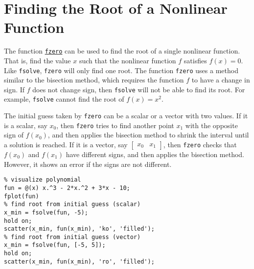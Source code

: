 \documentclass[12pt, a4paper]{article}
\begin{document}
\section{Finding the Root of a Nonlinear Function}
\label{sec:orge0a3896}
The function \href{https://www.mathworks.com/help/matlab/ref/fzero.html?s\_tid=doc\_ta}{\texttt{fzero}} can be used to find the root of a single nonlinear function.
That is, find the value \(x\) such that the nonlinear function \(f\) satisfies \(f(x)=0\).
Like \texttt{fsolve}, \texttt{fzero} will only find one root.
The function \texttt{fzero} uses a method similar to the bisection method, which requires the function \(f\) to have a change in sign.
If \(f\) does not change sign, then \texttt{fsolve} will not be able to find its root.
For example, \texttt{fsolve} cannot find the root of \(f(x)=x^2\).

The initial guess taken by \texttt{fzero} can be a scalar or a vector with two values.
If it is a scalar, say \(x_0\), then \texttt{fzero} tries to find another point \(x_1\) with the opposite sign of \(f(x_0)\), and then applies the bisection method to shrink the interval until a solution is reached.
If it is a vector, say \(\begin{bmatrix}x_0 & x_1\end{bmatrix}\), then \texttt{fzero} checks that \(f(x_0)\) and \(f(x_1)\) have different signs, and then applies the bisection method.
However, it shows an error if the signs are not different.

\lstset{language=matlab,label= ,caption= ,captionpos=b,firstnumber=1,numbers=left,style=Matlab-editor}
\begin{lstlisting}
% visualize polynomial
fun = @(x) x.^3 - 2*x.^2 + 3*x - 10;
fplot(fun)
% find root from initial guess (scalar)
x_min = fsolve(fun, -5);
hold on;
scatter(x_min, fun(x_min), 'ko', 'filled');
% find root from initial guess (vector)
x_min = fsolve(fun, [-5, 5]);
hold on;
scatter(x_min, fun(x_min), 'ro', 'filled');
\end{lstlisting}
\end{document}
